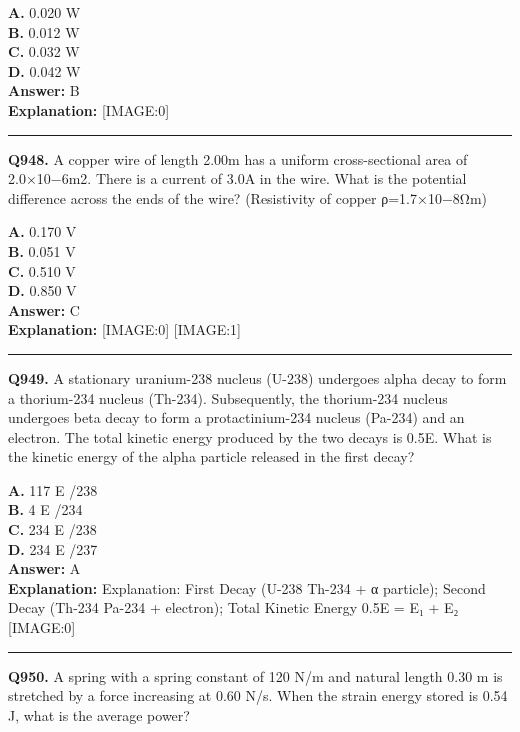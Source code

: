 \documentclass[12pt]{article}
\begin{document}
\textbf{A.} 0.020 W \\
\textbf{B.} 0.012 W \\
\textbf{C.} 0.032 W \\
\textbf{D.} 0.042 W \\

\textbf{Answer:} B \\
\textbf{Explanation:} [IMAGE:0]

\hrule
\vspace{1em}


\noindent
\textbf{Q948.} A copper wire of length 2.00m has a uniform cross-sectional area of 2.0×10−6m2. There is a current of 3.0A in the wire. What is the potential difference across the ends of the wire? (Resistivity of copper ρ=1.7×10−8Ω\cdot m)



\textbf{A.} 0.170 V \\
\textbf{B.} 0.051 V \\
\textbf{C.} 0.510 V \\
\textbf{D.} 0.850 V \\

\textbf{Answer:} C \\
\textbf{Explanation:} [IMAGE:0]
[IMAGE:1]

\hrule
\vspace{1em}


\noindent
\textbf{Q949.} A stationary uranium-238 nucleus (U-238) undergoes alpha decay to form a thorium-234 nucleus (Th-234). Subsequently, the thorium-234 nucleus undergoes beta decay to form a protactinium-234 nucleus (Pa-234) and an electron. The total kinetic energy produced by the two decays is 0.5E. What is the kinetic energy of the alpha particle released in the first decay?



\textbf{A.} 117
E
​/238 \\
\textbf{B.} 4
E
​/234 \\
\textbf{C.} 234
E
​/238 \\
\textbf{D.} 234
E
​/237 \\

\textbf{Answer:} A \\
\textbf{Explanation:} Explanation: First Decay (U-238 \to  Th-234 + α particle); Second Decay (Th-234 \to  Pa-234 + electron); Total Kinetic Energy 0.5E = E₁ + E₂
[IMAGE:0]

\hrule
\vspace{1em}


\noindent
\textbf{Q950.} A spring with a spring constant of 120 N/m and natural length 0.30 m is stretched by a force increasing at 0.60 N/s. When the strain energy stored is 0.54 J, what is the average power?
\end{document}
